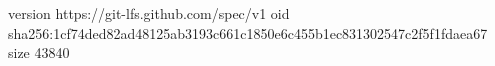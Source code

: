 version https://git-lfs.github.com/spec/v1
oid sha256:1cf74ded82ad48125ab3193c661c1850e6c455b1ec831302547c2f5f1fdaea67
size 43840

